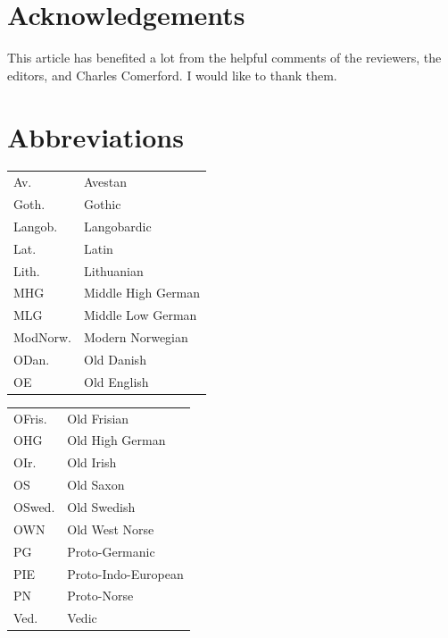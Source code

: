 \documentclass[output=paper,colorlinks,citecolor=brown]{langscibook}
\begin{document}
\section*{Acknowledgements}

This article has benefited a lot from the helpful comments of the reviewers, the editors, and Charles Comerford. I would like to thank them.


\section*{Abbreviations}

\begin{tabularx}{.5\textwidth}{lQ}
Av. & Avestan\\
Goth. & Gothic\\
Langob. & Langobardic\\
Lat. & Latin\\
Lith. & Lithuanian\\
MHG & Middle High German\\
MLG & Middle Low German\\
ModNorw. & Modern Norwegian\\
ODan. & Old Danish\\
OE & Old English\\
\end{tabularx}
\begin{tabularx}{.48\textwidth}{lQ}
OFris. & Old Frisian\\
OHG & Old High German\\
OIr. & Old Irish\\
OS & Old Saxon\\
OSwed. & Old Swedish\\
OWN & Old West Norse\\
PG & Proto-Germanic\\
PIE & Proto-Indo-European\\
PN & Proto-Norse\\
Ved. & Vedic\\
\end{tabularx}




{\sloppy\printbibliography[heading=subbibliography,notkeyword=this]}
\end{document}
